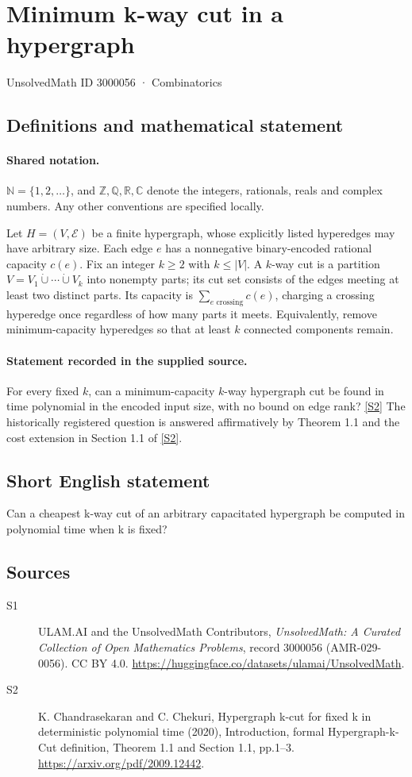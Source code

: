 \documentclass[11pt]{article}
\newcommand{\sref}[2]{\hyperlink{source:#1:#2}{[S#2]}}
\begin{document}
\setcounter{section}{3000055}
\section{Minimum k-way cut in a hypergraph}\label{3000056}
{\small\sffamily UnsolvedMath ID 3000056 · Combinatorics}
\subsection{Definitions and mathematical statement}

\paragraph{Shared notation.}$\mathbb N=\{1,2,\ldots\}$, and $\mathbb Z,\mathbb Q,\mathbb R,\mathbb C$ denote the integers, rationals, reals and complex numbers. Any other conventions are specified locally.


Let $H=(V,\mathcal E)$ be a finite hypergraph, whose explicitly listed hyperedges may have arbitrary size. Each edge $e$ has a nonnegative binary-encoded rational capacity $c(e)$. Fix an integer $k\ge2$ with $k\le|V|$. A $k$-way cut is a partition $V=V_1\dot\cup\cdots\dot\cup V_k$ into nonempty parts; its cut set consists of the edges meeting at least two distinct parts. Its capacity is $\sum_{e\text{ crossing}}c(e)$, charging a crossing hyperedge once regardless of how many parts it meets. Equivalently, remove minimum-capacity hyperedges so that at least $k$ connected components remain.
\paragraph{Statement recorded in the supplied source.}
For every fixed $k$, can a minimum-capacity $k$-way hypergraph cut be found in time polynomial in the encoded input size, with no bound on edge rank? \sref{3000056}{2}
The historically registered question is answered affirmatively by Theorem 1.1 and the cost extension in Section 1.1 of \sref{3000056}{2}.
\subsection{Short English statement}
Can a cheapest k-way cut of an arbitrary capacitated hypergraph be computed in polynomial time when k is fixed?
\subsection{Sources}
\begin{description}
\item[\hypertarget{source:3000056:1}{S1}] ULAM.AI and the UnsolvedMath Contributors, \emph{UnsolvedMath: A Curated Collection of Open Mathematics Problems}, record 3000056 (AMR-029-0056). CC BY 4.0. \url{https://huggingface.co/datasets/ulamai/UnsolvedMath}.
\item[\hypertarget{source:3000056:2}{S2}] K. Chandrasekaran and C. Chekuri, Hypergraph k-cut for fixed k in deterministic polynomial time (2020), Introduction, formal Hypergraph-k-Cut definition, Theorem 1.1 and Section 1.1, pp.1--3. \url{https://arxiv.org/pdf/2009.12442}.
\end{description}
\label{end:3000056}
\end{document}
